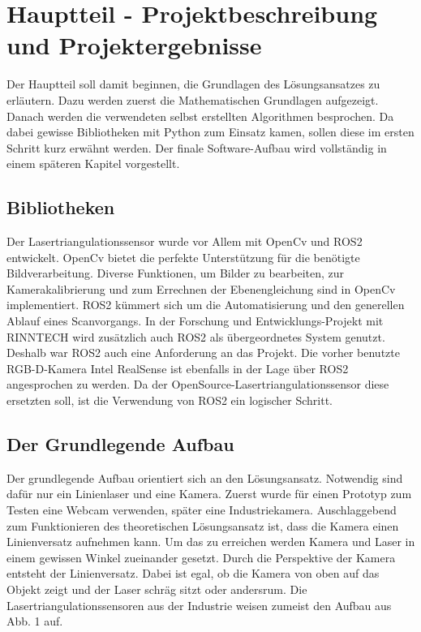 \section{Hauptteil - Projektbeschreibung und Projektergebnisse}\label{ergebnisse}
Der Hauptteil soll damit beginnen, die Grundlagen des Lösungsansatzes zu erläutern. Dazu werden zuerst die Mathematischen Grundlagen aufgezeigt. Danach werden die verwendeten selbst erstellten Algorithmen besprochen. Da dabei gewisse Bibliotheken mit Python zum Einsatz kamen, sollen diese im ersten Schritt kurz erwähnt werden. Der finale Software-Aufbau wird vollständig in einem späteren Kapitel vorgestellt.
	
	\subsection{Bibliotheken}
	Der Lasertriangulationssensor wurde vor Allem mit OpenCv und ROS2 entwickelt. OpenCv bietet die perfekte Unterstützung für die benötigte Bildverarbeitung. Diverse Funktionen, um Bilder zu bearbeiten, zur Kamerakalibrierung und zum Errechnen der Ebenengleichung sind in OpenCv implementiert.
	ROS2 kümmert sich um die Automatisierung und den generellen Ablauf eines Scanvorgangs. In der Forschung und Entwicklungs-Projekt mit RINNTECH wird zusätzlich auch ROS2 als übergeordnetes System genutzt. Deshalb war ROS2 auch eine Anforderung an das Projekt. Die vorher benutzte RGB-D-Kamera Intel RealSense ist ebenfalls in der Lage über ROS2 angesprochen zu werden. Da der OpenSource-Lasertriangulationssensor diese ersetzten soll, ist die Verwendung von ROS2 ein logischer Schritt.
	
	\subsection{Der Grundlegende Aufbau}
	Der grundlegende Aufbau orientiert sich an den Lösungsansatz. Notwendig sind dafür nur ein Linienlaser und eine Kamera. Zuerst wurde für einen Prototyp zum Testen eine Webcam verwenden, später eine Industriekamera. Auschlaggebend zum Funktionieren des theoretischen Lösungsansatz ist, dass die Kamera einen Linienversatz aufnehmen kann. Um das zu erreichen werden Kamera und Laser in einem gewissen Winkel zueinander gesetzt. Durch die Perspektive der Kamera entsteht der Linienversatz. Dabei ist egal, ob die Kamera von oben auf das Objekt zeigt und der Laser schräg sitzt oder andersrum. Die Lasertriangulationssensoren aus der Industrie weisen zumeist den Aufbau aus Abb. 1 auf.
	
